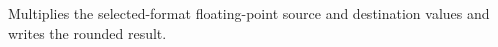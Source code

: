 Multiplies the selected-format floating-point source and destination values and writes the rounded result.
